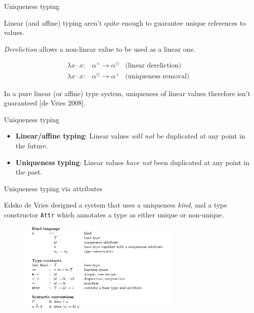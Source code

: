 \documentclass[10pt]{beamer}
\begin{document}
\begin{frame}[fragile]{Uniqueness typing}

Linear (and affine) typing aren't quite enough to guarantee unique references to values.

\textit{Dereliction} allows a non-linear value to be used as a linear one.

\begin{eqnarray*}
\lambda x \cdot x : & \alpha^\times \rightarrow \alpha^\odot & \text{(linear dereliction)}\\
\lambda x \cdot x : & \alpha^\odot \rightarrow \alpha^\times & \text{(uniqueness removal)}
\end{eqnarray*}

In a pure linear (or affine) type system, uniqueness of linear values therefore isn't guaranteed [de Vries 2008].
\end{frame}

\begin{frame}{Uniqueness typing}

\begin{itemize}
\item \textbf{Linear/affine typing}: Linear values \textit{will not} be duplicated at any point in the future.
\item \textbf{Uniqueness typing}: Linear values \textit{have not} been duplicated at any point in the past.
\end{itemize}

\end{frame}

\begin{frame}{Uniqueness typing via attributes}

Edsko de Vries designed a system that uses a uniqueness \textit{kind}, and a type constructor \texttt{Attr} which annotates a type as either unique or non-unique.

\begin{figure}[h]
\centering
\includegraphics[width=300px]{de_Vries_attributes.png}
\label{}
\end{figure}
\end{frame}
\end{document}
